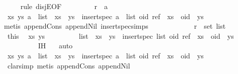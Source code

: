\begin{isabellebody}
\ \ \ \ \isamarkupfalse%
{\isacharparenleft}rule\ disjE{\isacharbrackleft}OF\ {}{\isacharbrackright}{\isacharparenright}\isanewline
\ \ \ \ \ \ \isamarkupfalse%
\ {\isachardoublequoteopen}r\ {\isacharequal}\ a{\isachardoublequoteclose}\isanewline
\ \ \ \ \ \ \isamarkupfalse%
\ {\isachardoublequoteopen}{\isasymexists}xs\ ys{\isachardot}\ a\ {\isacharhash}\ list\ {\isacharequal}\ xs\ {\isacharat}\ ys\ {\isasymand}\ insert{\isacharunderscore}spec\ {\isacharparenleft}a\ {\isacharhash}\ list{\isacharparenright}\ {\isacharparenleft}oid{\isacharcomma}\ ref{\isacharparenright}\ {\isacharequal}\ xs\ {\isacharat}\ oid\ {\isacharhash}\ ys{\isachardoublequoteclose}\isanewline
\ \ \ \ \ \ \ \ \isamarkupfalse%
\ {}\ \isamarkupfalse%
{\isacharparenleft}metis\ append{\isacharunderscore}Cons\ append{\isacharunderscore}Nil\ insert{\isacharunderscore}spec{\isachardot}simps{\isacharparenleft}{}{\isacharparenright}{\isacharparenright}\isanewline
\ \ \ \ \isamarkupfalse%
\isanewline
\ \ \ \ \ \ \isamarkupfalse%
\ {\isachardoublequoteopen}r\ {\isasymin}\ set\ list{\isachardoublequoteclose}\isanewline
\ \ \ \ \ \ \isamarkupfalse%
\ this\ \isamarkupfalse%
\ xs\ ys\isanewline
\ \ \ \ \ \ \ \ \ {\isachardoublequoteopen}list\ {\isacharequal}\ xs\ {\isacharat}\ ys\ {\isasymand}\ insert{\isacharunderscore}spec\ list\ {\isacharparenleft}oid{\isacharcomma}\ ref{\isacharparenright}\ {\isacharequal}\ xs\ {\isacharat}\ oid\ {\isacharhash}\ ys{\isachardoublequoteclose}\isanewline
\ \ \ \ \ \ \ \ \isamarkupfalse%
\ IH\ {}\ \isamarkupfalse%
\ auto\isanewline
\ \ \ \ \ \ \isamarkupfalse%
\ {\isachardoublequoteopen}{\isasymexists}xs\ ys{\isachardot}\ a\ {\isacharhash}\ list\ {\isacharequal}\ xs\ {\isacharat}\ ys\ {\isasymand}\ insert{\isacharunderscore}spec\ {\isacharparenleft}a\ {\isacharhash}\ list{\isacharparenright}\ {\isacharparenleft}oid{\isacharcomma}\ ref{\isacharparenright}\ {\isacharequal}\ xs\ {\isacharat}\ oid\ {\isacharhash}\ ys{\isachardoublequoteclose}\isanewline
\ \ \ \ \ \ \ \ \isamarkupfalse%
\ {}\ \isamarkupfalse%
\ clarsimp\ {\isacharparenleft}metis\ append{\isacharunderscore}Cons\ append{\isacharunderscore}Nil{\isacharparenright}\isanewline
\ \ \ \ \isamarkupfalse%
\isanewline
\ \ \isamarkupfalse%
\isanewline
{}\isamarkupfalse%

\end{isabellebody}
